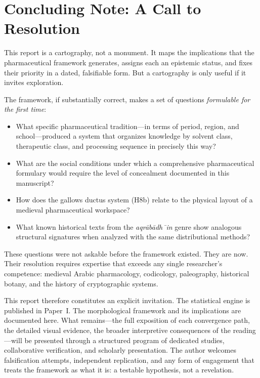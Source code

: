 \documentclass[11pt,a4paper]{article}
\begin{document}
\section{Concluding Note: A Call to Resolution}

This report is a cartography, not a monument. It maps the implications that the pharmaceutical framework generates, assigns each an epistemic status, and fixes their priority in a dated, falsifiable form. But a cartography is only useful if it invites exploration.

The framework, if substantially correct, makes a set of questions \textit{formulable for the first time}:

\begin{itemize}[leftmargin=2em]
\item What specific pharmaceutical tradition---in terms of period, region, and school---produced a system that organizes knowledge by solvent class, therapeutic class, and processing sequence in precisely this way?
\item What are the social conditions under which a comprehensive pharmaceutical formulary would require the level of concealment documented in this manuscript?
\item How does the gallows ductus system (H8b) relate to the physical layout of a medieval pharmaceutical workspace?
\item What known historical texts from the \textit{aqr\=ab\=adh\={\ i}n} genre show analogous structural signatures when analyzed with the same distributional methods?
\end{itemize}

These questions were not askable before the framework existed. They are now. Their resolution requires expertise that exceeds any single researcher's competence: medieval Arabic pharmacology, codicology, paleography, historical botany, and the history of cryptographic systems.

This report therefore constitutes an explicit invitation. The statistical engine is published in Paper~I. The morphological framework and its implications are documented here. What remains---the full exposition of each convergence path, the detailed visual evidence, the broader interpretive consequences of the reading---will be presented through a structured program of dedicated studies, collaborative verification, and scholarly presentation. The author welcomes falsification attempts, independent replication, and any form of engagement that treats the framework as what it is: a testable hypothesis, not a revelation.
\end{document}
